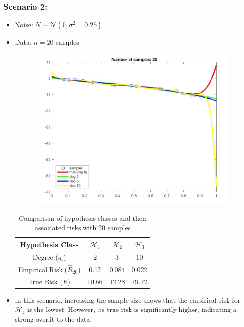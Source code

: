 \subsubsection*{Scenario 2:}
\begin{itemize}
    \item Noise: \( N\sim \mathcal{N}(0, \sigma^2 = 0.25) \)
    \item Data: \( n=20 \) samples
    \begin{figure}[H]
    \centering
    \includegraphics[width=0.55\linewidth]{img/3_20samp.png}
    \end{figure}
    \begin{table}[H]
\centering
\begin{tabular}{cccc}
\hline
\textbf{Hypothesis Class} & \( \mathcal{H}_1 \) & \( \mathcal{H}_2 \) & \( \mathcal{H}_3 \) \\
\hline
Degree (\( q_i \)) & 2 & 3 & 10 \\
Empirical Risk (\( \hat{R}_{20} \)) & 0.12 & 0.084 & 0.022 \\
True Risk (\( R \)) & 10.66 & 12.28 & 79.72 \\
\hline
\end{tabular}
\caption{Comparison of hypothesis classes and their associated risks with 20 samples}
\label{tab:hypothesis_risks_20samp}
\end{table}
    \item In this scenario, increasing the sample size shows that the empirical risk for \( \mathcal{H}_3 \) is the lowest. However, its true risk is significantly higher, indicating a strong overfit to the data.
\end{itemize}


